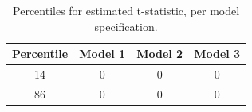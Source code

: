\begin{table}[h]

\caption{\label{tab:simulated_percentiles}Percentiles for estimated t-statistic, per model specification.}
\centering
\begin{tabular}[t]{cccc}
\toprule
Percentile & Model 1 & Model 2 & Model 3\\
\midrule
14 & 0 & 0 & 0\\
86 & 0 & 0 & 0\\
\bottomrule
\end{tabular}
\end{table}
